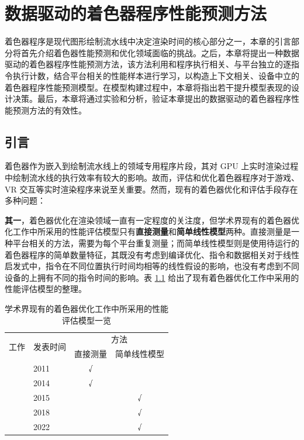 
\chapter{数据驱动的着色器程序性能预测方法}

{\amend 着色器程序是现代图形绘制流水线中决定渲染时间的核心部分之一，本章的引言部分将首先介绍着色器性能预测和优化领域面临的挑战。之后，}本章将提出一种数据驱动的着色器程序性能预测方法，{\amend 该方法利用和程序执行相关、与平台独立的逐指令执行计数，结合平台相关的性能样本进行学习，以构造上下文相关、设备中立的着色器程序性能预测模型。在模型构建过程中，本章将指出若干提升模型表现的设计决策。最后，本章将通过实验和分析，验证本章提出的数据驱动的着色器程序性能预测方法的有效性。}

\section{{\amend 引言}}

\label{sec:ch4_intro}

{\amend 着色器作为嵌入到绘制流水线上的领域专用程序片段，其对 GPU 上实时渲染过程中绘制流水线的执行效率有较大的影响。故而，评估和优化着色器程序对于游戏、VR 交互等实时渲染程序来说至关重要。然而，现有的着色器优化和评估手段存在多种问题：

{\bf 其一}，着色器优化在渲染领域一直有一定程度的关注度，但学术界现有的着色器优化工作中所采用的性能评估模型只有{\bf 直接测量}和{\bf 简单线性模型}两种。直接测量是一种平台相关的方法，需要为每个平台重复测量；而简单线性模型则是使用待运行的着色器程序的简单数量特征，其既没有考虑到编译优化、指令和数据相关对于线性启发式中，指令在不同位置执行时间均相等的线性假设的影响，也没有考虑到不同设备的上拥有不同的指令时间的影响。表 \ref{table:shader_optim_work_costs} 给出了现有着色器优化工作中采用的性能评估模型的整理。
}

\begin{table}[h]
    \centering
    \caption{学术界现有的着色器优化工作中所采用的性能评估模型一览}
    \label{table:shader_optim_work_costs}
    \begin{tabular}{l|l|cc}
    \toprule
    \multirow{2}{*}{工作}             & \multirow{2}{*}{发表时间} & \multicolumn{2}{c}{方法} \\
                                    &                     & 直接测量       & 简单线性模型      \\
    \midrule
    \citet{10.1145/2070781.2024186} & 2011                & √          &           \\
    \citet{10.1145/2661229.2661276} & 2014                & √          &           \\
    \citet{10.1145/2816795.2818104} & 2015                &            & √         \\
    \citet{10.1111/cgf.13482}       & 2018                &            & √         \\
    \citet{10.1145/3528233.3530722} & 2022                &            & √         \\
    \bottomrule
    \end{tabular}
\end{table}

